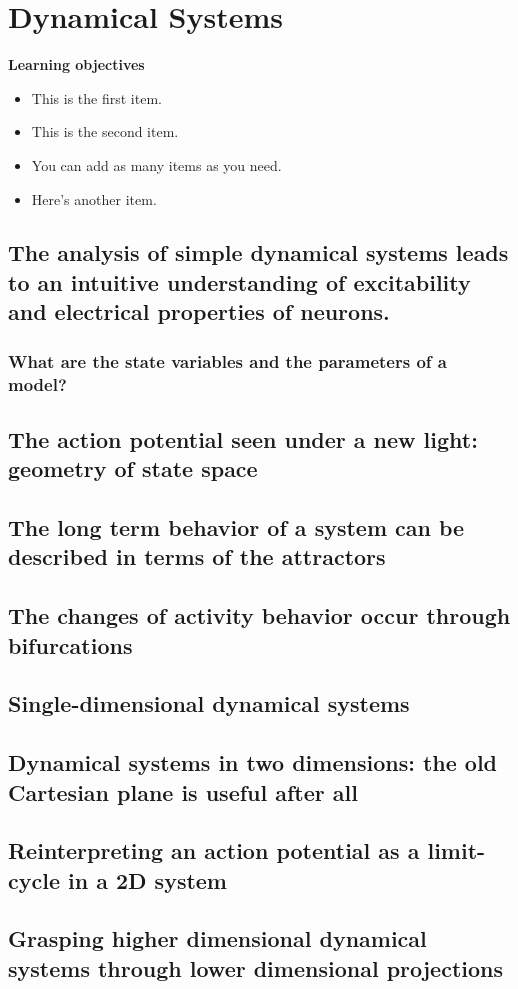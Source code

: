 \chapter{Dynamical Systems}
\label{dyn} %


\vspace{2cm} %

\begin{svgraybox}
{\bf{Learning objectives}}
\begin{itemize}
	\item This is the first item.
	\item This is the second item.
	\item You can add as many items as you need.
	\item Here's another item.
  \end{itemize}
\end{svgraybox}

\clearpage


\section{The analysis of simple dynamical systems leads to an intuitive understanding of excitability and electrical properties of neurons.}
	\subsection{What are the state variables and the parameters of a model?}
	\section{The action potential seen under a new light: geometry of state space}
	\section{The long term behavior of a system can be described in terms of the attractors}
	\section{The changes of activity behavior occur through bifurcations}
	\section{Single-dimensional dynamical systems}
	\section{Dynamical systems in two dimensions: the old Cartesian plane is useful after all}
	\section{Reinterpreting an action potential as a limit-cycle in a 2D system}
	\section{Grasping higher dimensional dynamical systems through lower dimensional projections}

